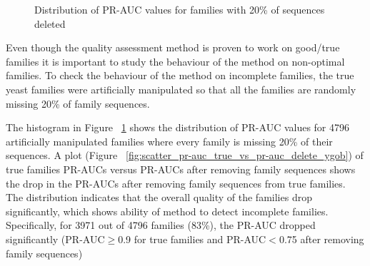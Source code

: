 \documentclass{article}
\begin{document}
		\begin{figure}
			\caption{Distribution of PR-AUC values for families with 20\% of sequences deleted}
			\label{fig:hist_pr-auc_delete_ygob}
		\end{figure}
		
		Even though the quality assessment method is proven to work on good/true families it is important to study the behaviour of the method on non-optimal families. To check the behaviour of the method on incomplete families, the true yeast families were artificially manipulated so that all the families are randomly missing 20\% of family sequences.
		
		The histogram in Figure ~\ref{fig:hist_pr-auc_delete_ygob} shows the distribution of PR-AUC values for 4796 artificially manipulated families where every family is missing 20\% of their sequences. A plot (Figure ~\ref{fig:scatter_pr-auc_true_vs_pr-auc_delete_ygob}) of true families PR-AUCs versus PR-AUCs after removing family sequences shows the drop in the PR-AUCs after removing family sequences from true families. The distribution indicates that the overall quality of the families drop significantly, which shows ability of method to detect incomplete families. Specifically, for 3971 out of 4796 families (83\%), the PR-AUC dropped significantly (PR-AUC$\geq$0.9 for true families and PR-AUC$<$0.75 after removing family sequences)
		
\end{document}
